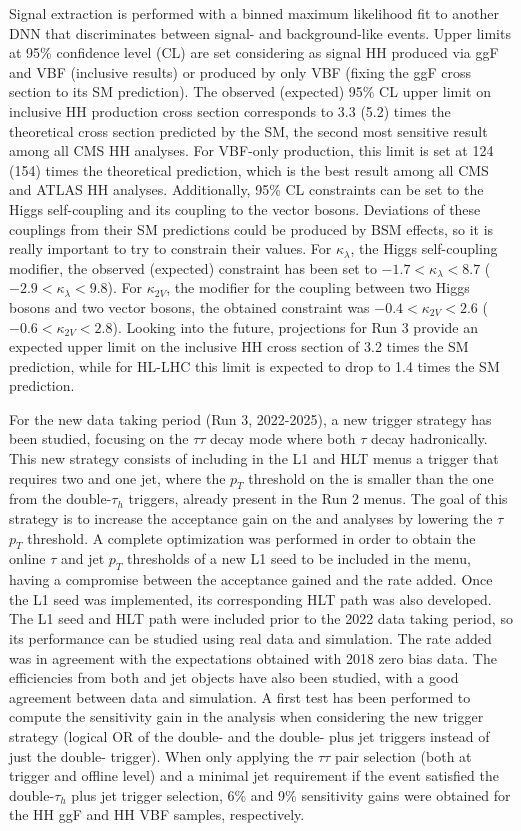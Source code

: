 \documentclass[main.tex]{subfiles}
\begin{document}
Signal extraction is performed with a binned maximum likelihood fit to another DNN that discriminates between signal- and background-like events. Upper limits at 95\% confidence level (CL) are set considering as signal HH produced via ggF and VBF (inclusive results) or produced by only VBF (fixing the ggF cross section to its SM prediction). The observed (expected) 95\% CL upper limit on inclusive HH production cross section corresponds to 3.3 (5.2) times the theoretical cross section predicted by the SM, the second most sensitive result among all CMS HH analyses. For VBF-only production, this limit is set at 124 (154) times the theoretical prediction, which is the best result among all CMS and ATLAS HH analyses. Additionally, 95\% CL constraints can be set to the Higgs self-coupling and its coupling to the vector bosons. Deviations of these couplings from their SM predictions could be produced by BSM effects, so it is really important to try to constrain their values. For $\kappa_\lambda$, the Higgs self-coupling modifier, the observed (expected) constraint has been set to $-1.7 < \kappa_\lambda < 8.7$ ($-2.9 < \kappa_\lambda < 9.8$). For $\kappa_{2V}$, the modifier for the coupling between two Higgs bosons and two vector bosons, the obtained constraint was $-0.4 < \kappa_{2V} < 2.6$ ($-0.6 < \kappa_{2V} < 2.8$). Looking into the future, projections for Run 3 provide an expected upper limit on the inclusive HH cross section of 3.2 times the SM prediction, while for HL-LHC this limit is expected to drop to 1.4 times the SM prediction. 

For the new data taking period (Run 3, 2022-2025), a new trigger strategy has been studied, focusing on the $\tau\tau$ decay mode where both $\tau$ decay hadronically. This new strategy consists of including in the L1 and HLT menus a trigger that requires two \tauh{} and one jet, where the $p_T$ threshold on the \tauh{} is smaller than the one from the double-$\tau_h$ triggers, already present in the Run 2 menus. The goal of this strategy is to increase the acceptance gain on the \htt{} and \hhbbtt{} analyses by lowering the $\tau$ $p_T$ threshold. A complete optimization was performed in order to obtain the online $\tau$ and jet $p_T$ thresholds of a new L1 seed to be included in the menu, having a compromise between the acceptance gained and the rate added. Once the L1 seed was implemented, its corresponding HLT path was also developed. The L1 seed and HLT path were included prior to the 2022 data taking period, so its performance can be studied using real data and simulation. The rate added was in agreement with the expectations obtained with 2018 zero bias data. The efficiencies from both \tauh{} and jet objects have also been studied, with a good agreement between data and simulation. A first test has been performed to compute the sensitivity gain in the \hhbbtt{} analysis when considering the new trigger strategy (logical OR of the double-\tauh{} and the double-\tauh{} plus jet triggers instead of just the double-\tauh{} trigger). When only applying the $\tau\tau$ pair selection (both at trigger and offline level) and a minimal jet requirement if the event satisfied the double-$\tau_h$ plus jet trigger selection, 6\% and 9\% sensitivity gains were obtained for the HH ggF and HH VBF samples, respectively.
\end{document}
